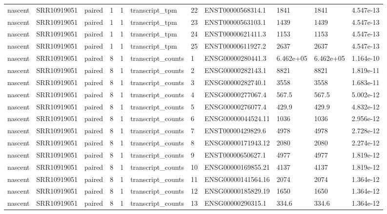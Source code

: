 \begin{tabular}{lllllllllll}
nascent & SRR10919051 & paired & 1 & 1 & transcript\_tpm & 22 & ENST00000568314.1 & 1841 & 1841 & 4.547e-13 \\
nascent & SRR10919051 & paired & 1 & 1 & transcript\_tpm & 23 & ENST00000563103.1 & 1439 & 1439 & 4.547e-13 \\
nascent & SRR10919051 & paired & 1 & 1 & transcript\_tpm & 24 & ENST00000621411.3 & 1153 & 1153 & 4.547e-13 \\
nascent & SRR10919051 & paired & 1 & 1 & transcript\_tpm & 25 & ENST00000611927.2 & 2637 & 2637 & 4.547e-13 \\
nascent & SRR10919051 & paired & 8 & 1 & transcript\_counts & 1 & ENSG00000280441.3 & 6.462e+05 & 6.462e+05 & 1.164e-10 \\
nascent & SRR10919051 & paired & 8 & 1 & transcript\_counts & 2 & ENSG00000282143.1 & 8821 & 8821 & 1.819e-11 \\
nascent & SRR10919051 & paired & 8 & 1 & transcript\_counts & 3 & ENSG00000282740.1 & 3558 & 3558 & 1.683e-11 \\
nascent & SRR10919051 & paired & 8 & 1 & transcript\_counts & 4 & ENSG00000277067.4 & 567.5 & 567.5 & 5.002e-12 \\
nascent & SRR10919051 & paired & 8 & 1 & transcript\_counts & 5 & ENSG00000276077.4 & 429.9 & 429.9 & 4.832e-12 \\
nascent & SRR10919051 & paired & 8 & 1 & transcript\_counts & 6 & ENSG00000044524.11 & 1036 & 1036 & 2.956e-12 \\
nascent & SRR10919051 & paired & 8 & 1 & transcript\_counts & 7 & ENST00000429829.6 & 4978 & 4978 & 2.728e-12 \\
nascent & SRR10919051 & paired & 8 & 1 & transcript\_counts & 8 & ENSG00000171943.12 & 2080 & 2080 & 2.274e-12 \\
nascent & SRR10919051 & paired & 8 & 1 & transcript\_counts & 9 & ENST00000650627.1 & 4977 & 4977 & 1.819e-12 \\
nascent & SRR10919051 & paired & 8 & 1 & transcript\_counts & 10 & ENSG00000169855.21 & 4137 & 4137 & 1.819e-12 \\
nascent & SRR10919051 & paired & 8 & 1 & transcript\_counts & 11 & ENSG00000141564.16 & 2074 & 2074 & 1.364e-12 \\
nascent & SRR10919051 & paired & 8 & 1 & transcript\_counts & 12 & ENSG00000185829.19 & 1650 & 1650 & 1.364e-12 \\
nascent & SRR10919051 & paired & 8 & 1 & transcript\_counts & 13 & ENSG00000290315.1 & 334.6 & 334.6 & 1.364e-12 \\

\end{tabular}
